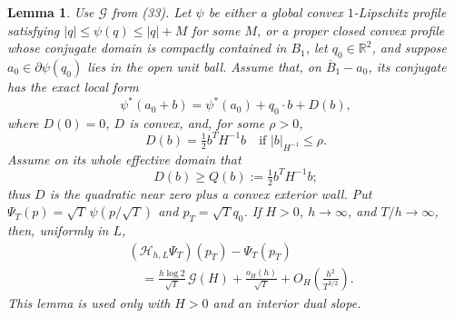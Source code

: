 \documentclass[11pt,reqno]{amsart}
\theoremstyle{plain}
\newtheorem{lemma}[theorem]{Lemma}
\theoremstyle{definition}
\theoremstyle{remark}
\numberwithin{equation}{section}
\newcommand{\1}{\mathbf 1}
\begin{document}
\begin{lemma}\label{lem:nonlinear-consistency}
Use $\mathcal G$ from (33).  Let $\psi$ be either a global convex
$1$-Lipschitz profile satisfying $|q|\leq\psi(q)\leq|q|+M$ for some $M$,
or a proper closed convex profile
whose conjugate domain is compactly contained in $B_ 1$,
let $q_ 0\in\mathbb R^2$, and suppose
$a_ 0\in\partial\psi(q_ 0)$ lies in the open unit ball.  Assume that,
on $\overline B_ 1-a_ 0$, its conjugate has the exact local form
\begin{equation}
\psi^*(a_ 0+b)=\psi^*(a_ 0)+q_ 0\cdot b+D(b),
\tag{34}
\end{equation}
where $D(0)=0$, $D$ is convex, and, for some $\rho>0$,
\begin{equation}
D(b)=\tfrac12b^TH^{-1}b\quad\text{if }|b|_ {H^{-1}}\leq\rho.
\tag{34a}
\end{equation}
Assume on its whole effective domain that
\begin{equation*}
D(b)\geq Q(b):=\tfrac12b^TH^{-1}b;
\end{equation*}
thus $D$ is the quadratic near zero plus a convex exterior wall.  Put
$\Psi_ T(p)=\sqrt T\,\psi(p/\sqrt T)$ and
$p_ T=\sqrt Tq_ 0$.  If $H>0$, $h\to\infty$, and
$T/h\to\infty$, then, uniformly in $L$,
\begin{equation}
\begin{split}
&(\mathcal H_ {h,L}\Psi_ T)(p_ T)-\Psi_ T(p_ T)\\
&\quad=\frac{h\log2}{\sqrt T}\,\mathcal G(H)+\frac{o_ H(h)}{\sqrt T}
+O_ H\!\left(\frac{h^2}{T^{3/2}}\right).
\end{split}
\tag{35}
\end{equation}
This lemma is used only with $H>0$ and an interior dual slope.

\end{lemma}
\end{document}
